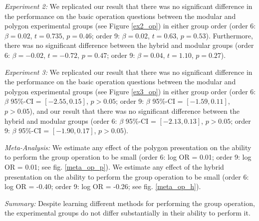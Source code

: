 \documentclass[man,10pt]{apa6}
\begin{document}
\textit{Experiment 2:} We replicated our result that there was no significant difference in the performance on the basic operation questions between the modular and polygon experimental groups (see Figure \ref{ex2_op}) in either group order (order 6: $\beta = 0.02$, $t = 0.735$, $p = 0.46$; order 9: $\beta = 0.02$, $t = 0.63$, $p = 0.53$). Furthermore, there was no significant difference between the hybrid and modular groups (order 6: $\beta = -0.02$, $t = -0.72$, $p = 0.47$; order 9: $\beta = 0.04$, $t = 1.10$, $p = 0.27$).\par
\textit{Experiment 3:} We replicated our result that there was no significant difference in the performance on the basic operation questions between the modular and polygon experimental groups (see Figure \ref{ex3_op}) in either group order (order 6: $\beta$ 95\%-CI = $[-2.55,0.15]$, $p > 0.05$; order 9: $\beta$ 95\%-CI = $[-1.59,0.11]$, $p > 0.05$), and our result that there was no significant difference between the hybrid and modular groups (order 6:  $\beta$ 95\%-CI = $[-2.13,0.13]$, $p > 0.05$; order 9: $\beta$ 95\%-CI = $[-1.90,0.17]$, $p > 0.05$). \par
\textit{Meta-Analysis:} We estimate any effect of the polygon presentation on the ability to perform the group operation to be small (order 6: log OR = 0.01; order 9: log OR = 0.01; see fig. \ref{meta_op_p}). We estimate any effect of the hybrid presentation on the ability to perform the group operation to be small (order 6: log OR = -0.40; order 9: log OR = -0.26; see fig. \ref{meta_op_h}).\par
\textit{Summary:} Despite learning different methods for performing the group operation, the experimental groups do not differ substantially in their ability to perform it. 
\FloatBarrier
\end{document}
